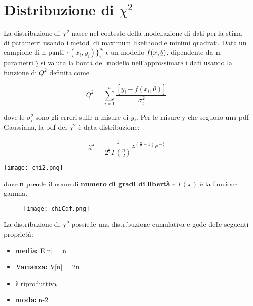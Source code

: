 \documentclass[11pt,a4paper]{book}
\begin{document}
\section{Distribuzione di $\chi^2$}


La distribuzione di $\chi^2$ nasce nel contesto della modellazione di dati per la stima di parametri usando i metodi di maximum likelihood e minimi quadrati. Dato un campione di n punti $\{(x_i,y_i)\}_{i}^N$ e un modello $f(x, \bold{\underline{\theta}})$, dipendente da m parametri $\underline{\theta}$ si valuta la bont\`{a} del modello nell'approssimare i dati usando la funzione di $Q^2$ definita come:

\begin{equation}
	Q^2 = \sum_{i=1}^{n}\dfrac{[y_i - f(x_i,\underline{\theta})]}{\sigma^2_i}
\end{equation}

dove le $\sigma^2_i$ sono gli errori sulle n misure di $y_i$. 
\newline
Per le misure y che seguono una pdf Gaussiana, la pdf del $\chi^2$ \`{e} data distribuzione:


\vspace{0.3in}

  \begin{minipage}{0.5\textwidth}
\begin{equation*}
	\chi^2 = \dfrac{1}{2^{\frac{n}{2}}\Gamma(\frac{n}{2})}z^{(\frac{n}{2}-1)}e^{-\frac{z}{2}}
\end{equation*}
  \end{minipage}
  \begin{minipage}{.4\textwidth}
    \centering
    \texttt{[image: chi2.png]}

  \end{minipage}
\vspace{0.3in}

dove \textbf{n} prende il nome di \textbf{numero di gradi di libert\`{a}} e $\Gamma(x)$ \`{e} la funzione gamma.

\begin{wrapfigure}[7]{l}{0.\textwidth}
\centering

\texttt{[image: chiCdf.png]}	

\end{wrapfigure}

\noindent La distribuzione di $\chi^2$ possiede una distribuzione cumulativa e gode delle seguenti propriet\`{a}:

\begin{itemize}
	\item \textbf{media:} E[n] = n
	\item \textbf{Varianza:} V[n] = 2n
	\item \`{e} riproduttiva
	\item \textbf{moda:} n-2
	\end{itemize}
	
\end{document}
